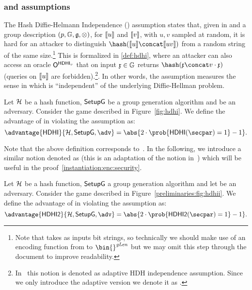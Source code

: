 \subsubsection{\hdhi{} and \hdhii{} assumptions}

The Hash Diffie-Helmann Independence (\hdhi{}) assumption states that, given \hash{} in \hashSet{} and a group description $(p, \mathbb{G}, \mathfrak{g}, \otimes)$, for $\llbracket {u} \rrbracket$ and $\llbracket {v} \rrbracket$, with $u,v$ sampled at random, it is hard for an attacker to distinguish $\hash(\groupenc{u} \concat \groupenc{uv})$ from a random string of the same size.\footnote{Note that \hash{} takes as inputs bit strings, so technically we should make use of an encoding function from \gset to $\bin{}^{\groupLen}$ but we may omit this step through the document to improve readability.} This is formalized in \cref{def:hdhi}, where an attacker can also access an oracle $\mathsf{O}^{\mathsf{HDHI}_{v}}$ that on input $\mathfrak{x} \in \mathbb{G}$ returns $\hash(\gel{x} \concat v\cdot \gel{x})$ (queries on $\llbracket {u} \rrbracket$ are forbidden).\footnote{In~\cite[Section 3.2.1]{abdalla1999dhaes} this notion is denoted as adaptive HDH independence assumption. Since we only introduce the adaptive version we denote it as \hdhi{}.}. In other words, the \hdhi{} assumption measures the sense in which \hash{} is ``independent'' of the underlying Diffie-Hellman problem.

\begin{definition}\label{def:hdhi}
    Let $\mathcal{H}$ be a hash function, $\mathsf{SetupG}$ be a group generation algorithm and \adv{} be an adversary. Consider the \hdhi{} game described in Figure~\ref{fig:hdhi}. We define the advantage of \adv{} in violating the \hdhi{} assumption as:
    \[
        \advantage{\hdhi}{\hashSet,\groupSetup, \adv} =  \abs{2\cdot\prob{\hdhi(\secpar) = 1} - 1}.
    \]

\end{definition}
Note that the above definition corresponds to~\cite[Section 3.2.1, Definition 3]{abdalla1999dhaes}. In the following, we introduce a similar notion denoted as \hdhii{} (this is an adaptation of the \odhii{} notion in~\cite[Section 6]{abdalla2010robust}) which will be useful in the \ikcca{} proof~\cref{instantiation:enc:security}.

\begin{definition}[\hdhii]\label{preliminaries:definitions:hdhii}
    Let $\mathcal{H}$ be a hash function, $\mathsf{SetupG}$ a group generation algorithm and let \adv{} be an adversary. Consider the \hdhii{} game described in Figure~\ref{preliminaries:fig:hdhii}. We define the advantage of \adv{} in violating the \hdhii{} assumption as:
    \[
        \advantage{\hdhii}{\hashSet, \groupSetup, \adv} =  \abs{2 \cdot \prob{\hdhii(\secpar) = 1} - 1}.
    \]
\end{definition}

